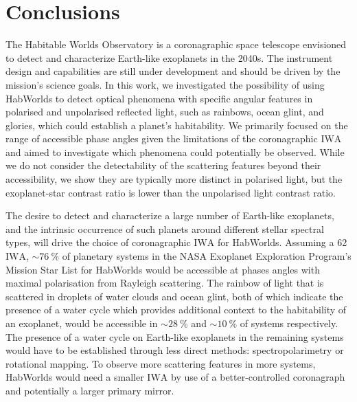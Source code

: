 \documentclass[usenatbib]{mnras}
\newcommand{\IWA}{\ensuremath{\mathrm{IWA}}\xspace}
\newcommand{\HWO}{HabWorlds\xspace}
\begin{document}
\vspace{-2mm}
\section{Conclusions}
\label{sec:5}

The Habitable Worlds Observatory is a coronagraphic space telescope envisioned to detect and characterize Earth-like exoplanets in the 2040s. 
%
The instrument design and capabilities are still under development and should be driven by the mission's science goals.
%
In this work, we investigated the possibility of using \HWO to detect optical phenomena with specific angular features in polarised and unpolarised reflected light, such as rainbows, ocean glint, and glories, which could establish a planet's habitability. 
%
We primarily focused on the range of accessible phase angles given the limitations of the coronagraphic \IWA and aimed to investigate which phenomena could potentially be observed.
%
While we do not consider the detectability of the scattering features beyond their accessibility, we show they are typically more distinct in polarised light, but the exoplanet-star contrast ratio is lower than the unpolarised light contrast ratio.

The desire to detect and characterize a large number of Earth-like exoplanets, and the intrinsic occurrence of such planets around different stellar spectral types, will drive the choice of coronagraphic \IWA for \HWO. 
%
Assuming a \qty{62}{\mas} \IWA, $\sim\qty{76}{\percent}$ of planetary systems in the NASA Exoplanet Exploration Program's Mission Star List for \HWO would be accessible at phases angles with maximal polarisation from Rayleigh scattering.
%
The rainbow of light that is scattered in droplets of water clouds and ocean glint, both of which indicate the presence of a water cycle which provides additional context to the habitability of an exoplanet, would be accessible in $\sim\qty{28}{\percent}$ and $\sim\qty{10}{\percent}$ of systems respectively.
%
The presence of a water cycle on Earth-like exoplanets in the remaining systems would have to be established through less direct methods: spectropolarimetry or rotational mapping.
%
To observe more scattering features in more systems, \HWO would need a smaller \IWA by use of a better-controlled coronagraph and potentially a larger primary mirror.
\end{document}
